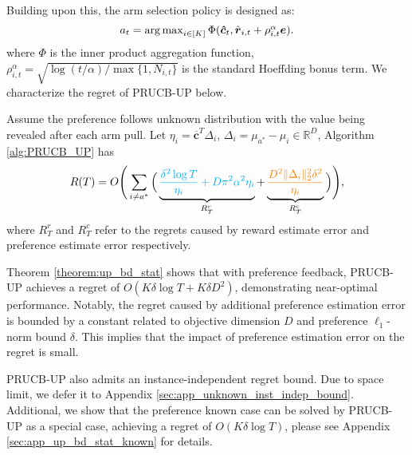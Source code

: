 


Building upon this, the arm selection policy is designed as:
\vspace{-5pt}
\begin{equation}
\label{eq:prucb_spm_at}
\textstyle
a_t = \argmaxA_{i \in [K]} \Phi ( \boldsymbol{\hat{c}}_t,  \hat{\boldsymbol{r}}_{i,t} + \rho_{i,t}^{\alpha} \boldsymbol{e} ).
\vspace{-2pt}
\end{equation}
where $\Phi$ is the inner product aggregation function, $\rho_{i,t}^{\alpha} = \sqrt{ \log(t/\alpha) / \max \{1, N_{i, t } \} }$ is the standard Hoeffding bonus term.
We characterize the regret of PRUCB-UP below.

\begin{theorem}
\label{theorem:up_bd_stat}
Assume the preference follows unknown distribution with the value being revealed after each arm pull. 
Let $\eta_{i} = \boldsymbol{\overline{c}}^{T} \Delta_{i}$, 
$\Delta_{i} = \mu_{a^{*}} - \mu_{i} \in \mathbb{R}^D$,
Algorithm \ref{alg:PRUCB_UP} has
\[
R(T) 
=
O
\Bigg(
\sum_{i \neq a^{*}}
\Big(
\underbrace{
\textcolor{cyan}{
\frac{\delta^2 \log T}{\eta_{i}} 
+
D \pi^2 \alpha^2 \eta_{i}
}}_{R^{r}_T}
 +
\underbrace{
\textcolor{orange}{
\frac{ D^2 \Vert \Delta_{i} \Vert_2^2 \delta^2 }{ \eta_{i} }
}}_{R^{c}_T}
\Big)
\Bigg),
\]
where $R^{r}_T$ and $R^{c}_T$ refer to the regrets caused by reward estimate error and preference estimate error respectively.
\end{theorem}


\begin{remark}
Theorem \ref{theorem:up_bd_stat} shows that with preference feedback, PRUCB-UP achieves a regret of $O(K \delta \log T + K \delta D^2)$, demonstrating near-optimal performance. Notably, the regret caused by additional preference estimation error is bounded by a constant related to objective dimension $D$ and preference $\ell_1$-norm bound $\delta$. 
This implies that the impact of preference estimation error on the regret is small.

PRUCB-UP also admits an instance-independent regret bound. Due to space limit, we defer it to Appendix \ref{sec:app_unknown_inst_indep_bound}.
Additional, we show that the preference known case can be solved by PRUCB-UP as a special case, achieving a regret of $O(K \delta \log T)$, please see Appendix \ref{sec:app_up_bd_stat_known} for details. 

\end{remark}


